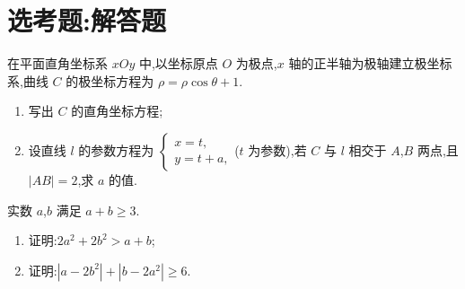 \section{选考题:解答题}

\begin{problem}
在平面直角坐标系 \( xOy \) 中,以坐标原点 \(O\) 为极点,\( x \) 轴的正半轴为极轴建立极坐标系,曲线 \(C\) 的极坐标方程为 \( \rho=\rho\cos\theta+1 \).

\begin{enumerate}
\item 写出 \(C\) 的直角坐标方程;
\item 设直线 \( l \) 的参数方程为 \(\begin{cases}
x=t,\\
y=t+a,
\end{cases}\)(\( t \) 为参数),若 \(C\) 与 \( l \) 相交于 \(A\),\(B\) 两点,且 \( |AB|=2 \),求 \( a \) 的值.
\end{enumerate}
\end{problem}

\begin{problem}
实数 \(a\),\(b\) 满足 \( a+b\ge 3 \).

\begin{enumerate}
\item 证明:\( 2a^2+2b^2>a+b \);
\item 证明:\( |a-2b^2|+|b-2a^2|\ge 6 \).
\end{enumerate}
\end{problem}

